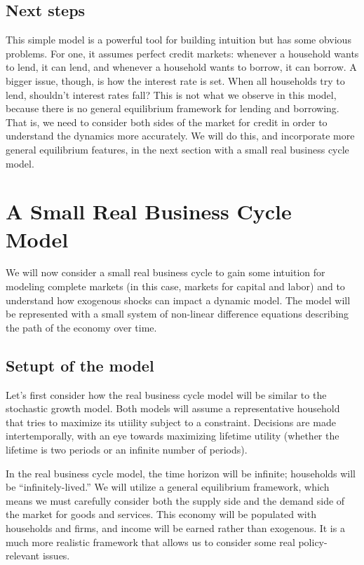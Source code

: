 \documentclass[12pt]{article}
\begin{document}
\subsection{Next steps}

This simple model is a powerful tool for building intuition but has some obvious problems. For one, it assumes perfect credit markets: whenever a household wants to lend, it can lend, and whenever a household wants to borrow, it can borrow. A bigger issue, though, is how the interest rate is set. When all households try to lend, shouldn't interest rates fall? This is not what we observe in this model, because there is no general equilibrium framework for lending and borrowing. That is, we need to consider both sides of the market for credit in order to understand the dynamics more accurately. We will do this, and incorporate more general equilibrium features, in the next section with a small real business cycle model.

\section{A Small Real Business Cycle Model}

We will now consider a small real business cycle to gain some intuition for modeling complete markets (in this case, markets for capital and labor) and to understand how exogenous shocks can impact a dynamic model. The model will be represented with a small system of non-linear difference equations describing the path of the economy over time.

\subsection{Setupt of the model}

Let's first consider how the real business cycle model will be similar to the stochastic growth model. Both models will assume a representative household that tries to maximize its utiility subject to a constraint. Decisions are made intertemporally, with an eye towards maximizing lifetime utility (whether the lifetime is two periods or an infinite number of periods). 

In the real business cycle model, the time horizon will be infinite; households will be ``infinitely-lived.'' We will utilize a general equilibrium framework, which means we must carefully consider both the supply side and the demand side of the market for goods and services. This economy will be populated with households and firms, and income will be earned rather than exogenous. It is a much more realistic framework that allows us to consider some real policy-relevant issues.
\end{document}
